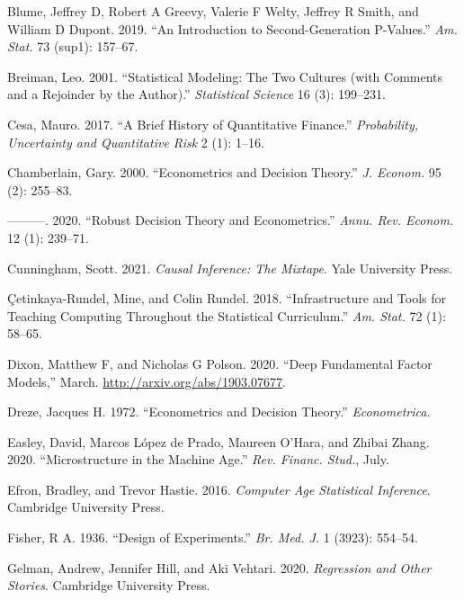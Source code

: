\documentclass{article}
\begin{document}
\leavevmode\hypertarget{ref-Blume2019}{}%
Blume, Jeffrey D, Robert A Greevy, Valerie F Welty, Jeffrey R Smith, and
William D Dupont. 2019. ``An Introduction to Second-Generation
P-Values.'' \emph{Am. Stat.} 73 (sup1): 157--67.

\leavevmode\hypertarget{ref-Breiman2001}{}%
Breiman, Leo. 2001. ``Statistical Modeling: The Two Cultures (with
Comments and a Rejoinder by the Author).'' \emph{Statistical Science} 16
(3): 199--231.

\leavevmode\hypertarget{ref-Cesa2017}{}%
Cesa, Mauro. 2017. ``A Brief History of Quantitative Finance.''
\emph{Probability, Uncertainty and Quantitative Risk} 2 (1): 1--16.

\leavevmode\hypertarget{ref-Chamberlain2000}{}%
Chamberlain, Gary. 2000. ``Econometrics and Decision Theory.'' \emph{J.
Econom.} 95 (2): 255--83.

\leavevmode\hypertarget{ref-Chamberlain2020}{}%
---------. 2020. ``Robust Decision Theory and Econometrics.''
\emph{Annu. Rev. Econom.} 12 (1): 239--71.

\leavevmode\hypertarget{ref-Cunningham2021}{}%
Cunningham, Scott. 2021. \emph{Causal Inference: The Mixtape}. Yale
University Press.

\leavevmode\hypertarget{ref-Cetinkaya-Rundel2018}{}%
Çetinkaya-Rundel, Mine, and Colin Rundel. 2018. ``Infrastructure and
Tools for Teaching Computing Throughout the Statistical Curriculum.''
\emph{Am. Stat.} 72 (1): 58--65.

\leavevmode\hypertarget{ref-Dixon2020}{}%
Dixon, Matthew F, and Nicholas G Polson. 2020. ``Deep Fundamental Factor
Models,'' March. \url{http://arxiv.org/abs/1903.07677}.

\leavevmode\hypertarget{ref-Dreze1972}{}%
Dreze, Jacques H. 1972. ``Econometrics and Decision Theory.''
\emph{Econometrica}.

\leavevmode\hypertarget{ref-Easley2020}{}%
Easley, David, Marcos López de Prado, Maureen O'Hara, and Zhibai Zhang.
2020. ``Microstructure in the Machine Age.'' \emph{Rev. Financ. Stud.},
July.

\leavevmode\hypertarget{ref-Efron2016}{}%
Efron, Bradley, and Trevor Hastie. 2016. \emph{Computer Age Statistical
Inference}. Cambridge University Press.

\leavevmode\hypertarget{ref-Fisher1936}{}%
Fisher, R A. 1936. ``Design of Experiments.'' \emph{Br. Med. J.} 1
(3923): 554--54.

\leavevmode\hypertarget{ref-Gelman2020}{}%
Gelman, Andrew, Jennifer Hill, and Aki Vehtari. 2020. \emph{Regression
and Other Stories}. Cambridge University Press.
\end{document}
